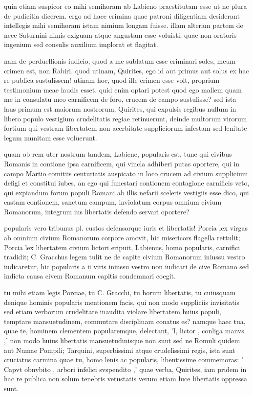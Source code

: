  quin etiam suspicor eo mihi semihoram ab Labieno praestitutam esse ut ne plura de pudicitia dicerem. ergo ad haec crimina quae patroni diligentiam desiderant intellegis mihi semihoram istam nimium longam fuisse. illam alteram partem de nece Saturnini nimis exiguam atque angustam esse voluisti; quae non oratoris ingenium sed consulis auxilium implorat et flagitat.

 nam de perduellionis iudicio, quod a me sublatum esse criminari soles, meum crimen est, non Rabiri. quod utinam, Quirites, ego id aut primus aut solus ex hac re publica sustulissem! utinam hoc, quod ille crimen esse volt, proprium testimonium meae laudis esset. quid enim optari potest quod ego mallem quam me in consulatu meo carnificem de foro, crucem de campo sustulisse? sed ista laus primum est maiorum nostrorum, Quirites, qui expulsis regibus nullum in libero populo vestigium crudelitatis regiae retinuerunt, deinde multorum virorum fortium qui vestram libertatem non acerbitate suppliciorum infestam sed lenitate legum munitam esse voluerunt.

 quam ob rem uter nostrum tandem, Labiene, popularis est, tune qui civibus Romanis in contione ipsa carnificem, qui vincla adhiberi putas oportere, qui in campo Martio comitiis centuriatis auspicato in loco crucem ad civium supplicium defigi et constitui iubes, an ego qui funestari contionem contagione carnificis veto, qui expiandum forum populi Romani ab illis nefarii sceleris vestigiis esse dico, qui castam contionem, sanctum campum, inviolatum corpus omnium civium Romanorum, integrum ius libertatis defendo servari oportere?

 popularis vero tribunus pl. custos defensorque iuris et libertatis! Porcia lex virgas ab omnium civium Romanorum corpore amovit, hic misericors flagella rettulit; Porcia lex libertatem civium lictori eripuit, Labienus, homo popularis, carnifici tradidit; C. Gracchus legem tulit ne de capite civium Romanorum iniussu vestro iudicaretur, hic popularis a ii viris iniussu vestro non iudicari de cive Romano sed indicta causa civem Romanum capitis condemnari coegit.

 tu mihi etiam legis Porciae, tu C. Gracchi, tu horum libertatis, tu cuiusquam denique hominis popularis mentionem facis, qui non modo suppliciis invisitatis sed etiam verborum crudelitate inaudita violare libertatem huius populi, temptare mansuetudinem, commutare disciplinam conatus es? namque haec tua, quae te, hominem clementem popularemque, delectant, 'I, lictor , conliga manvs ,' non modo huius libertatis mansuetudinisque non sunt sed ne Romuli quidem aut Numae Pompili; Tarquini, superbissimi atque crudelissimi regis, ista sunt cruciatus carmina quae tu, homo lenis ac popularis, libentissime commemoras: ' Capvt obnvbito , arbori infelici svspendito ,' quae verba, Quirites, iam pridem in hac re publica non solum tenebris vetustatis verum etiam luce libertatis oppressa sunt.

